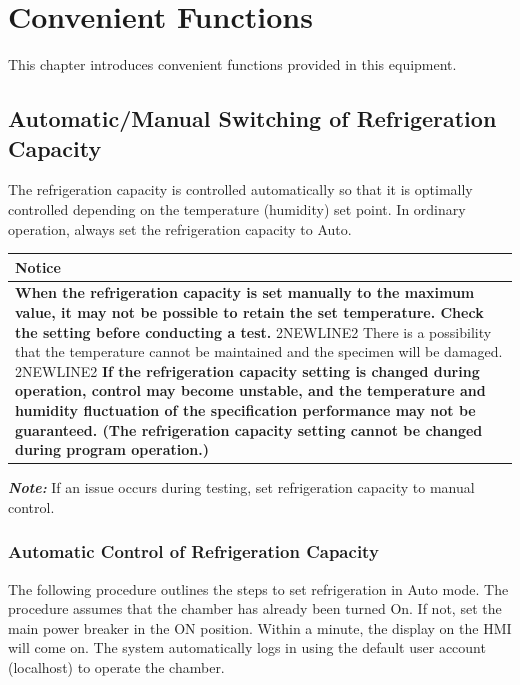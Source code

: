 \chapter{Convenient Functions}

This chapter introduces convenient functions provided in this equipment.


\section{Automatic/Manual Switching of Refrigeration
Capacity}

The refrigeration capacity is controlled automatically so that it is
optimally controlled depending on the temperature (humidity) set point.
In ordinary operation, always set the refrigeration capacity to Auto.

\begin{longtable}[]{@{}l@{}}
\toprule
\begin{minipage}[b]{0.97\columnwidth}\raggedright
\textbf{Notice}\strut
\end{minipage}\tabularnewline
\midrule
\endhead
\begin{minipage}[t]{0.97\columnwidth}\raggedright
\textbf{When the refrigeration capacity is set manually to the maximum
value, it may not be possible to retain the set temperature. Check the
setting before conducting a test.} 2NEWLINE2 There is a possibility that
the temperature cannot be maintained and the specimen will be damaged.
2NEWLINE2 \textbf{If the refrigeration capacity setting is changed
during operation, control may become unstable, and the temperature and
humidity fluctuation of the specification performance may not be
guaranteed. (The refrigeration capacity setting cannot be changed during
program operation.)}\strut
\end{minipage}\tabularnewline
\bottomrule
\end{longtable}

\textbf{\emph{Note:}} If an issue occurs during testing, set
refrigeration capacity to manual control.


\subsection{Automatic Control of Refrigeration
Capacity}

The following procedure outlines the steps to set refrigeration in Auto
mode. The procedure assumes that the chamber has already been turned On.
If not, set the main power breaker in the ON position. Within a minute,
the display on the HMI will come on. The system automatically logs in
using the default user account (localhost) to operate the chamber.

